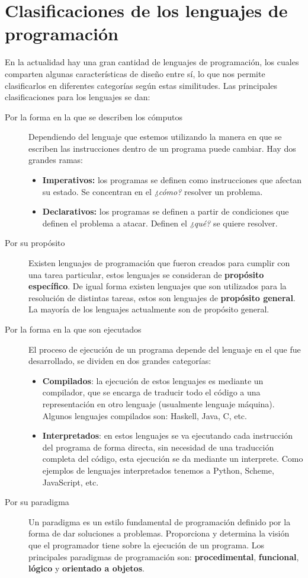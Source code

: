 \documentclass[12pt]{extarticle}
\begin{document}
\section{Clasificaciones de los lenguajes de programación}
En la actualidad hay una gran cantidad de lenguajes de programación, los cuales comparten algunas características de diseño entre sí, lo que nos permite clasificarlos en diferentes categorías según estas similitudes. Las principales clasificaciones para los lenguajes se dan:
\begin{description}
    \item[Por la forma en la que se describen los cómputos] Dependiendo del lenguaje que estemos utilizando la manera en que se escriben las instrucciones dentro de un programa puede cambiar. Hay dos grandes ramas:
    \begin{itemize}
        \item {\bf Imperativos: } los programas se definen como instrucciones que afectan su estado. Se concentran en el {\it ¿cómo?} resolver un problema.
        \item {\bf Declarativos: } los programas se definen a partir de condiciones que definen el problema a atacar. Definen el {\it ¿qué?} se quiere resolver.
    \end{itemize}
    \item[Por su propósito] Existen lenguajes de programación que fueron creados para cumplir con una tarea particular, estos lenguajes se consideran de {\bf propósito específico}. De igual forma existen lenguajes que son utilizados para la resolución de distintas tareas, estos son lenguajes de {\bf propósito general}. La mayoría de los lenguajes actualmente son de propósito general.
    \item[Por la forma en la que son ejecutados] El proceso de ejecución de un programa depende del lenguaje en el que fue desarrollado, se dividen en dos grandes categorías:
    \begin{itemize}
        \item {\bf Compilados}: la ejecución de estos lenguajes es mediante un compilador, que se encarga de traducir todo el código a una representación en otro lenguaje (usualmente lenguaje máquina). Algunos lenguajes compilados son: {\sf Haskell}, {\sf Java}, {\sf C}, etc.
        \item {\bf Interpretados}: en estos lenguajes se va ejecutando cada instrucción del programa de forma directa, sin necesidad de una traducción completa del código, esta ejecución se da mediante un interprete. Como ejemplos de lenguajes interpretados tenemos a {\sf Python}, {\sf Scheme}, {\sf JavaScript}, etc.
    \end{itemize}
    \item[Por su paradigma] Un paradigma es un estilo fundamental de programación definido por la forma de dar soluciones a problemas. Proporciona y determina la visión que el programador tiene sobre la ejecución de un programa. Los principales paradigmas de programación son: {\bf procedimental}, {\bf funcional}, {\bf lógico} y {\bf orientado a objetos}. 


\end{description}
\end{document}
